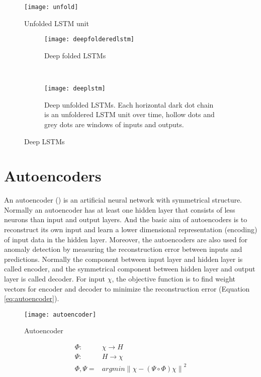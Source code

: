 \begin{figure}[h]
\centering
\texttt{[image: unfold]}
\caption[Unfolded LSTM unit]{Unfolded LSTM unit}
\label{fig:unfolded}
\end{figure}

\begin{figure}[h]
\centering
	\begin {subfigure}[t]{0.45\textwidth}
	\centering
	\texttt{[image: deepfolderedlstm]}
	\caption{Deep folded LSTMs}
	\label{fig:deeplstm1}
	\end{subfigure}
	~
	\begin {subfigure}[t]{0.45\textwidth}
	\centering
	\texttt{[image: deeplstm]}
	\caption{Deep unfolded LSTMs. Each horizontal dark dot chain is an unfoldered LSTM unit over time, hollow dots and grey dots are windows of inputs and outputs.}
	\label{fig:deeplstm2}
	\end{subfigure}
	\caption[Deep LSTMs]{Deep LSTMs}
\label{fig:deeplstm}

\end{figure}

\section{Autoencoders}
\label{sec:Autoencoders}

An autoencoder () is an artificial neural network with symmetrical structure. Normally an autoencoder has at least one hidden layer that consists of less neurons than input and output layers. And the basic aim of autoencoders is to reconstruct its own input and learn a lower dimensional representation (encoding) of input data in the hidden layer. Moreover, the autoencoders are also used for anomaly detection by measuring the reconstruction error between inputs and predictions.
Normally the component between input layer and hidden layer is called encoder, and the symmetrical component between hidden layer and output layer is called decoder. For input $\chi$, the objective function is to find weight vectors for encoder and decoder to minimize the reconstruction error (Equation \ref{eq:autoencoder}).

\begin{figure}[h]
\centering
\texttt{[image: autoencoder]}
\caption[Autoencoder]{Autoencoder}
\label{fig:autoencoder}
\end{figure}

\begin{equation} \label{eq:autoencoder}
\begin{aligned}
\Phi : &\chi \rightarrow H \\
\Psi : &H \rightarrow \chi \\
\Phi, \Psi = &argmin \left \| \chi-(\Psi \circ \Phi)\chi \right \|^2
\end{aligned}
\end{equation}


